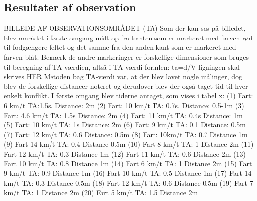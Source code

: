 \subsection{Resultater af observation}
\label{sub:def_konflikt}
BILLEDE AF OBSERVATIONSOMRÅDET (TA)
Som der kan ses på billedet, blev området i første omgang målt op fra kanten som er markeret med farven rød til fodgængere feltet og det samme fra den anden kant som er markeret med farven blåt. Bemærk de andre markeringer er forskellige dimensioner som bruges til beregning af TA-værdien, altså i TA-værdi formlen: ta=d/V ligningen skal skrives HER
Metoden bag TA-værdi var, at der blev lavet nogle målinger, dog blev de forskellige distancer noteret og derudover blev der også taget tid til hver enkelt konflikt. I første omgang blev tiderne antaget, som vises i tabel x:
(1) Fart: 6 km/t TA:1.5s. Distance: 2m
(2) Fart: 10 km/t TA: 0.7s. Distance: 0.5-1m
(3) Fart: 4.6 km/t TA: 1.5s Distance: 2m
(4) Fart: 11 km/t TA: 0.4s Distance: 1m
(5) Fart: 10 km/t TA: 1s Distance: 2m
(6) Fart: 9 km/t TA: 0.1 Distance: 0.5m
(7) Fart: 12 km/t TA: 0.6 Distance: 0.5m
(8) Fart: 10km/t TA: 0.7 Distance 1m
(9) Fart 14 km/t TA: 0.4 Distance 0.5m
(10) Fart 8 km/t TA: 1 Distance 2m
(11) Fart 12 km/t TA: 0.3 Distance 1m
(12) Fart 11 km/t TA: 0.6 Distance 2m
(13) Fart 10 km/t TA: 0.8 Distance 1m
(14) Fart 6 km/t TA: 1 Distance 2m
(15) Fart 9 km/t TA: 0.9 Distance 1m
(16) Fart 10 km/t TA: 0.5 Distance 1m
(17) Fart 14 km/t TA: 0.3 Distance 0.5m
(18) Fart 12 km/t TA: 0.6 Distance 0.5m
(19) Fart 7 km/t TA: 1 Distance 2m
(20) Fart 5 km/t TA: 1.5 Distance 2m

